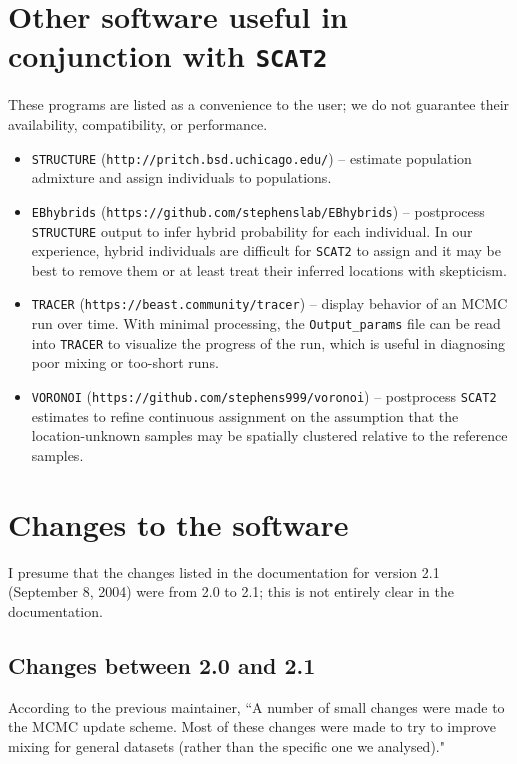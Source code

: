 \documentclass[10pt,titlepage,times,letterpaper]{article}
\def\SCAT{{\tt SCAT2} }
\begin{document}
\section{Other software useful in conjunction with \SCAT} \label{software}

These programs are listed as a convenience to the user; we do not
guarantee their availability, compatibility, or performance.

\begin{itemize}
\item {\tt STRUCTURE} ({\tt http://pritch.bsd.uchicago.edu/}) -- estimate
population admixture and assign individuals to populations.
\item {\tt EBhybrids} ({\tt https://github.com/stephenslab/EBhybrids}) -- 
postprocess {\tt STRUCTURE} output to infer hybrid probability for each 
individual.  In our experience, hybrid individuals are difficult for \SCAT 
to assign and it may be best to remove them or at least treat their
inferred locations with skepticism.
\item {\tt TRACER} ({\tt https://beast.community/tracer}) -- display behavior
of an MCMC run over time.  With minimal processing, the {\tt Output\_params}
file can be read into {\tt TRACER} to visualize the progress of the run,
which is useful in diagnosing poor mixing or too-short runs.
\item {\tt VORONOI} ({\tt https://github.com/stephens999/voronoi}) --
postprocess \SCAT estimates to refine continuous assignment on the
assumption that the location-unknown samples may be spatially clustered
relative to the reference samples.
\end{itemize}


\section{Changes to the software} 

I presume that the changes listed in the documentation for version 2.1
(September 8, 2004) were from 2.0 to 2.1; this is not entirely clear in
the documentation.

\subsection{Changes between 2.0 and 2.1}

According to the previous maintainer, ``A number of small changes were made to the MCMC update scheme.
Most of these changes were made to try to
improve mixing for general datasets (rather than the specific one we
analysed)."  
\end{document}
